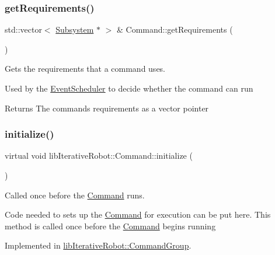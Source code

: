 \subsubsection{\texorpdfstring{getRequirements()}{getRequirements()}}
{\footnotesize\ttfamily std\+::vector$<$ \mbox{\hyperlink{classlib_iterative_robot_1_1_subsystem}{Subsystem}} $\ast$ $>$ \& Command\+::get\+Requirements (\begin{DoxyParamCaption}{ }\end{DoxyParamCaption})\hspace{0.3cm}{\ttfamily [protected]}}



Gets the requirements that a command uses. 

Used by the \mbox{\hyperlink{classlib_iterative_robot_1_1_event_scheduler}{Event\+Scheduler}} to decide whether the command can run

\begin{DoxyReturn}{Returns}
The command\textquotesingle{}s requirements as a vector pointer 
\end{DoxyReturn}
\mbox{\label{classlib_iterative_robot_1_1_command_a14543c9d38b07e52f9ffb2af88a63f60}} 
\subsubsection{\texorpdfstring{initialize()}{initialize()}}
{\footnotesize\ttfamily virtual void lib\+Iterative\+Robot\+::\+Command\+::initialize (\begin{DoxyParamCaption}{ }\end{DoxyParamCaption})\hspace{0.3cm}{\ttfamily [pure virtual]}}



Called once before the \mbox{\hyperlink{classlib_iterative_robot_1_1_command}{Command}} runs. 

Code needed to sets up the \mbox{\hyperlink{classlib_iterative_robot_1_1_command}{Command}} for execution can be put here. This method is called once before the \mbox{\hyperlink{classlib_iterative_robot_1_1_command}{Command}} begins running 

Implemented in \mbox{\hyperlink{classlib_iterative_robot_1_1_command_group_a99800c5dbd05ab750aa0bb27518d0467}{lib\+Iterative\+Robot\+::\+Command\+Group}}.

